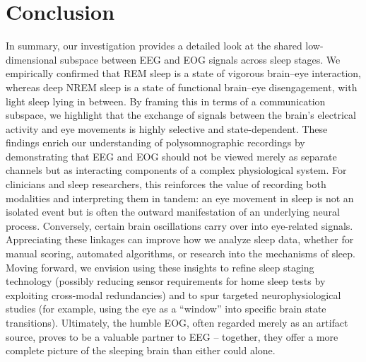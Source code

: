\section{Conclusion}

In summary, our investigation provides a detailed look at the shared low-dimensional subspace between EEG and EOG signals across sleep stages. We empirically confirmed that REM sleep is a state of vigorous brain–eye interaction, whereas deep NREM sleep is a state of functional brain–eye disengagement, with light sleep lying in between. By framing this in terms of a communication subspace, we highlight that the exchange of signals between the brain’s electrical activity and eye movements is highly selective and state-dependent. These findings enrich our understanding of polysomnographic recordings by demonstrating that EEG and EOG should not be viewed merely as separate channels but as interacting components of a complex physiological system. For clinicians and sleep researchers, this reinforces the value of recording both modalities and interpreting them in tandem: an eye movement in sleep is not an isolated event but is often the outward manifestation of an underlying neural process. Conversely, certain brain oscillations carry over into eye-related signals. Appreciating these linkages can improve how we analyze sleep data, whether for manual scoring, automated algorithms, or research into the mechanisms of sleep. Moving forward, we envision using these insights to refine sleep staging technology (possibly reducing sensor requirements for home sleep tests by exploiting cross-modal redundancies) and to spur targeted neurophysiological studies (for example, using the eye as a “window” into specific brain state transitions). Ultimately, the humble EOG, often regarded merely as an artifact source, proves to be a valuable partner to EEG – together, they offer a more complete picture of the sleeping brain than either could alone.



